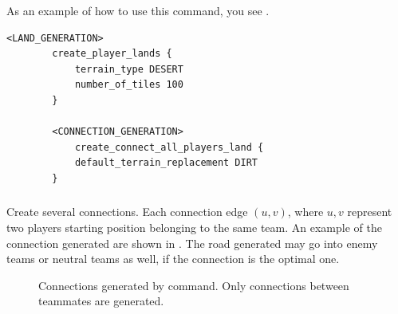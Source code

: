 \begin{appendices}
    As an example of how to use this command, you see .

    \begin{lstlisting}[language={rms}, label={lst:connectionplayers}, caption={Example showing how you can connect all players with dirt.}]
        <LAND_GENERATION>
        create_player_lands {
            terrain_type DESERT
            number_of_tiles 100
        }

        <CONNECTION_GENERATION>
            create_connect_all_players_land {
            default_terrain_replacement DIRT
        }
    \end{lstlisting}

    \subsubsection{}

    Create several connections. Each connection edge $(u,v)$, where $u,v$ represent two players starting position belonging to the same team. An example of the connection generated are shown in . The road generated may go into enemy teams or neutral teams as well, if the connection is the optimal one.

    \begin{figure}[ht]
        \centering
        \caption{Connections generated by  command. Only connections between teammates are generated.}
        \label{fig:createconnectteamslands}
    \end{figure}


\end{appendices}
